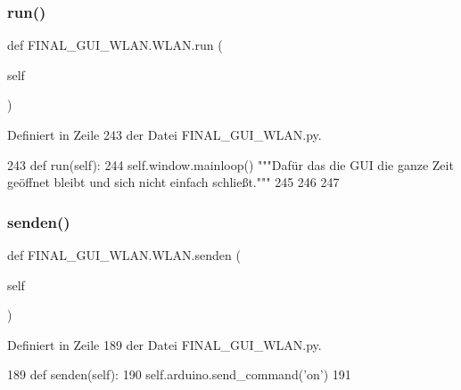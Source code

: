 \subsubsection{\texorpdfstring{run()}{run()}}
{\footnotesize\ttfamily def F\+I\+N\+A\+L\+\_\+\+G\+U\+I\+\_\+\+W\+L\+A\+N.\+W\+L\+A\+N.\+run (\begin{DoxyParamCaption}\item[{}]{self }\end{DoxyParamCaption})}



Definiert in Zeile 243 der Datei F\+I\+N\+A\+L\+\_\+\+G\+U\+I\+\_\+\+W\+L\+A\+N.\+py.


\begin{DoxyCode}
243     \textcolor{keyword}{def }run(self):
244         self.window.mainloop()          \textcolor{stringliteral}{"""Dafür das die GUI die ganze Zeit geöffnet bleibt und sich nicht
       einfach schließt."""}
245         
246    
247 
\end{DoxyCode}
\mbox{\label{class_f_i_n_a_l___g_u_i___w_l_a_n_1_1_w_l_a_n_a8dd7e606685fb67b54e2c53626e46fba}} 
\subsubsection{\texorpdfstring{senden()}{senden()}}
{\footnotesize\ttfamily def F\+I\+N\+A\+L\+\_\+\+G\+U\+I\+\_\+\+W\+L\+A\+N.\+W\+L\+A\+N.\+senden (\begin{DoxyParamCaption}\item[{}]{self }\end{DoxyParamCaption})}



Definiert in Zeile 189 der Datei F\+I\+N\+A\+L\+\_\+\+G\+U\+I\+\_\+\+W\+L\+A\+N.\+py.


\begin{DoxyCode}
189     \textcolor{keyword}{def }senden(self):
190         self.arduino.send\_command(\textcolor{stringliteral}{'on'})
191     
\end{DoxyCode}
\mbox{\label{class_f_i_n_a_l___g_u_i___w_l_a_n_1_1_w_l_a_n_a5fe71f63b3060bb7a5d1511aa0eeaf1c}} 
